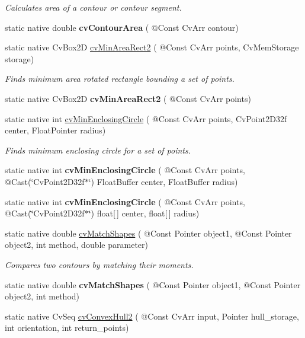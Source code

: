 \begin{DoxyCompactItemize}
\begin{DoxyCompactList}\small\item\em Calculates area of a contour or contour segment. \end{DoxyCompactList}\item 
static native double {\bfseries cv\+Contour\+Area} ( @Const Cv\+Arr contour)
\item 
static native Cv\+Box2D \hyperlink{group__imgproc__c_ga4c0de18f88f591ddd8e7c21559b28813}{cv\+Min\+Area\+Rect2} ( @Const Cv\+Arr points, Cv\+Mem\+Storage storage)
\begin{DoxyCompactList}\small\item\em Finds minimum area rotated rectangle bounding a set of points. \end{DoxyCompactList}\item 
static native Cv\+Box2D {\bfseries cv\+Min\+Area\+Rect2} ( @Const Cv\+Arr points)
\item 
static native int \hyperlink{group__imgproc__c_ga20312fae33ba176dda93b108421e4fc7}{cv\+Min\+Enclosing\+Circle} ( @Const Cv\+Arr points, Cv\+Point2\+D32f center, Float\+Pointer radius)
\begin{DoxyCompactList}\small\item\em Finds minimum enclosing circle for a set of points. \end{DoxyCompactList}\item 
static native int {\bfseries cv\+Min\+Enclosing\+Circle} ( @Const Cv\+Arr points, @Cast(\char`\"{}Cv\+Point2\+D32f$\ast$\char`\"{}) Float\+Buffer center, Float\+Buffer radius)
\item 
static native int {\bfseries cv\+Min\+Enclosing\+Circle} ( @Const Cv\+Arr points, @Cast(\char`\"{}Cv\+Point2\+D32f$\ast$\char`\"{}) float\mbox{[}$\,$\mbox{]} center, float\mbox{[}$\,$\mbox{]} radius)
\item 
static native double \hyperlink{group__imgproc__c_gab9210add45c3838c6939630bb55fa97f}{cv\+Match\+Shapes} ( @Const Pointer object1, @Const Pointer object2, int method, double parameter)
\begin{DoxyCompactList}\small\item\em Compares two contours by matching their moments. \end{DoxyCompactList}\item 
static native double {\bfseries cv\+Match\+Shapes} ( @Const Pointer object1, @Const Pointer object2, int method)
\item 
static native Cv\+Seq \hyperlink{group__imgproc__c_ga97e54b0658572d02cdef5ae91799499d}{cv\+Convex\+Hull2} ( @Const Cv\+Arr input, Pointer hull\+\_\+storage, int orientation, int return\+\_\+points)

\end{DoxyCompactItemize}
